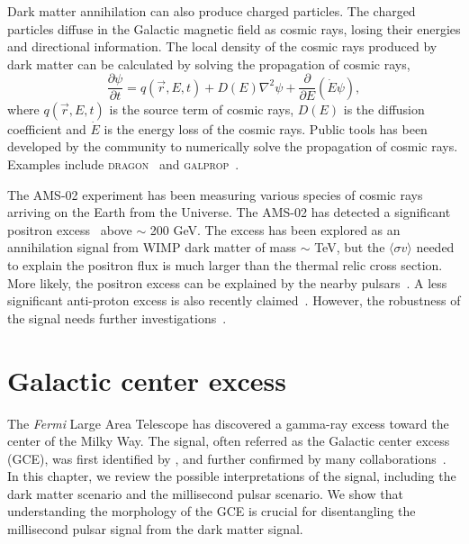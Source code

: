 \documentclass[doublespace,nopageskip]{VTthesis} %
\newcommand{\sigmav}{\langle\sigma v\rangle}
\begin{document}
Dark matter annihilation can also produce charged particles. The charged particles diffuse in the Galactic magnetic field as cosmic rays, losing their energies and directional information. The local density of the cosmic rays produced by dark matter can be calculated by solving the propagation of cosmic rays,
\begin{equation}
    \frac{\partial\psi}{\partial t} = q(\vec{r},E,t) + D(E)\nabla^2\psi + \frac{\partial}{\partial E}(\dot{E}\psi),
\end{equation}
where $q(\vec{r},E,t)$ is the source term of cosmic rays, $D(E)$ is the diffusion coefficient and $\dot{E}$ is the energy loss of the cosmic rays. Public tools has been developed by the community to numerically solve the propagation of cosmic rays. Examples include \textsc{dragon}~\cite{2010APh....34..274D} and \textsc{galprop}~\cite{1998ApJ...509..212S}.

The AMS-02 experiment has been measuring various species of cosmic rays arriving on the Earth from the Universe. The AMS-02 has detected a significant positron excess~\cite{2014PhRvL.113l1101A} above $\sim$ 200 GeV. The excess has been explored as an annihilation signal from WIMP dark matter of mass $\sim$ TeV, but the $\sigmav$ needed to explain the positron flux is much larger than the thermal relic cross section. More likely, the positron excess can be explained by the nearby pulsars~\cite{2009JCAP...01..025H}. A less significant anti-proton excess is also recently claimed~\cite{2017PhRvL.118s1101C}. However, the robustness of the signal needs further investigations~\cite{2019PhRvD..99j3026C, 2021arXiv210714606H}.


\chapter{Galactic center excess} \label{ch:GCE}

The \emph{Fermi} Large Area Telescope has discovered a gamma-ray excess toward the center of the Milky Way. The signal, often referred as the Galactic center excess (GCE), was first identified by \citet{2009arXiv0910.2998G}, and further confirmed by many collaborations~\cite{2009arXiv0912.3828V,2011PhLB..697..412H,2012PhRvD..86h3511A,2013PhRvD..88h3521G,2014PhRvD..89f3515M,2013PDU.....2..118H,2014PhRvD..90b3526A,2016PDU....12....1D,2015JCAP...03..038C,2015PhRvD..91l3010Z,2016ApJ...819...44A,2017ApJ...840...43A}. In this chapter, we review the possible interpretations of the signal, including the dark matter scenario and the millisecond pulsar scenario. We show that understanding the morphology of the GCE is crucial for disentangling the millisecond pulsar signal from the dark matter signal.
\end{document}
